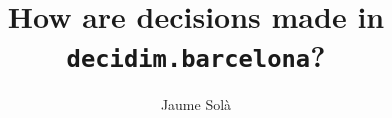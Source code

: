 \documentclass[a4paper,12pt,twoside]{report}
\begin{document}

\title{How are decisions made in \texttt{decidim.barcelona}?}
\author{Jaume Sol\`a}
%

\maketitle
\restoregeometry

\preface
\cleardoublepage 
%
%


\body






\listoffigures
\newpage
\listoftables



\end{document}
